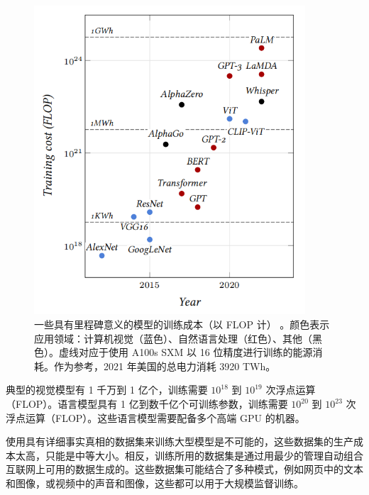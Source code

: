 \begin{figure}
    \centering
    \includegraphics[width=0.9\textwidth]{fig/fig3.7.png}
    \caption[模型训练费用]{一些具有里程碑意义的模型的训练成本（以 FLOP 计） \citep{visualization}。颜色表示应用领域：计算机视觉（蓝色）、自然语言处理（红色）、其他（黑色）。虚线对应于使用 A100s SXM 以 16 位精度进行训练的能源消耗。作为参考，2021 年美国的总电力消耗 3920 TWh。}
    \label{fig3.7}
\end{figure}

典型的视觉模型有 1 千万到 1 亿个，训练需要 $10^{18}$ 到 $10^{19}$ 次浮点运算（FLOP）\cite{arxiv-1512.03385, arxiv-2202.05924}。语言模型具有 1 亿到数千亿个可训练参数，训练需要 $10^{20}$ 到 $10^{23}$ 次浮点运算（FLOP）\citep{arxiv-1810.04805, arxiv-2005.14165, arxiv-2204.02311, arxiv-2202.05924}。这些语言模型需要配备多个高端 GPU 的机器。

使用具有详细事实真相的数据集来训练大型模型是不可能的，这些数据集的生产成本太高，只能是中等大小。相反，训练所用的数据集是通过用最少的管理自动组合互联网上可用的数据生成的。这些数据集可能结合了多种模式，例如网页中的文本和图像，或视频中的声音和图像，这些都可以用于大规模监督训练。

